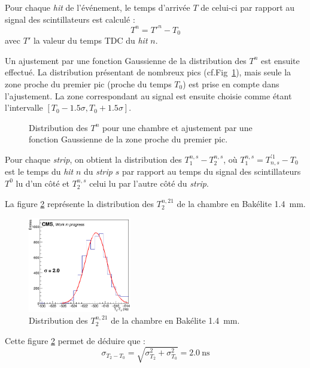 Pour chaque \textit{hit} de l'événement, le temps d'arrivée $T$ de celui-ci par rapport au signal des scintillateurs est calculé :
\begin{equation}
	T^n=T'^n-T_0
\end{equation}
avec $T'$ la valeur du temps TDC du \textit{hit} $n$. 

Un ajustement par une fonction Gaussienne de la distribution des $T^n$ est ensuite effectué. La distribution présentant de nombreux pics (cf.Fig~\ref{pics}), mais seule la zone proche du premier pic (proche du temps $T_0$) est prise en compte dans l'ajustement. La zone correspondant au signal est ensuite choisie comme étant l'intervalle $\left[T_0-\num{1.5}\sigma,T_0+\num{1.5}\sigma\right]$.

\begin{figure}[!ht]
	\centering
	\caption{Distribution des $T^n$ pour une chambre et ajustement par une fonction Gaussienne de la zone proche du premier pic.}
	\label{pics}
\end{figure}

Pour chaque \textit{strip}, on obtient la distribution des $T^{n,s}_1-T^{n,s}_2$, où $T^{n,s}_1=T_{n,s}^{'1}-T_0$ est le temps du \textit{hit} $n$ du \textit{strip} $s$ par rapport au temps du signal des scintillateurs $T^{0}$ lu d'un côté et $T^{n,s}_2$ celui lu par l'autre côté du \textit{strip}.

La figure \ref{t2t0} représente la distribution des $T^{n,21}_2$ de la chambre en Bakélite \SI{1.4}{\milli\meter}.
\begin{figure}[ht!]
	\centering
	\includegraphics[width=0.40\textwidth]{ELE/TimingFitsRunT1T0_zoom_736185.jpg}
	\captionsetup{type=figure}\caption{Distribution des $T^{n,21}_2$ de la chambre en Bakélite \SI{1.4}{\milli\meter}.}
	\label{t2t0}
\end{figure}

Cette figure \ref{t2t0} permet de déduire que :
\begin{equation}
\sigma_{T_2-T_0}=\sqrt{\sigma_{T_2}^2+\sigma_{T_0}^2}=\SI{2.0}{\nano\second}
\end{equation}

